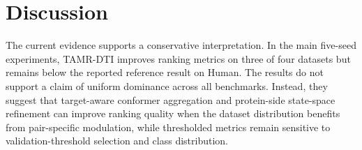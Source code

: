 \section{Discussion}

The current evidence supports a conservative interpretation. In the main five-seed experiments, TAMR-DTI improves ranking metrics on three of four datasets but remains below the reported reference result on Human. The results do not support a claim of uniform dominance across all benchmarks. Instead, they suggest that target-aware conformer aggregation and protein-side state-space refinement can improve ranking quality when the dataset distribution benefits from pair-specific modulation, while thresholded metrics remain sensitive to validation-threshold selection and class distribution.
